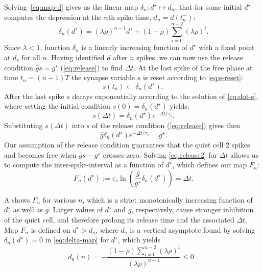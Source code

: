 \documentclass[utf8,draft]{frontiersFPHY} %
\newcommand{\dstar}{d^\star}
\newcommand{\gbar}{\bar g}
\newcommand{\delt}{\Delta t}
\newcommand{\dn}{\delta_n}
\begin{document}
Solving~\eqref{eq:map-d} gives us the linear map $\delta_{n}:d^{\star}\mapsto d_{n}$, that for some initial $d^{\star}$ computes the depression at the $n$th spike time, $d_{n}=d(t_{n}^{-})$:
\begin{equation}
 ~\label{eq:delta-map}
  \delta_{n}(d^{\star}) = (\lambda \rho)^{n-1} d^{\star} + (1-\rho)\sum_{i=0}^{n-2}(\lambda \rho)^{i}.
\end{equation}
Since $\lambda < 1$, function $\delta_{n}$ is a linearly increasing function of $d^{\star}$ with a fixed point at $d_{s}$ for all $n$.
Having identified $d$ after $n$ spikes, we can now use the release condition $\gbar s = g^{\star}$ (\cref{eq:release}) to find $\delt$.
At the last spike of the free phase at time $t_{n}=(n-1)T$ the synapse variable $s$ is reset according to \cref{eq:s-reset}:
\begin{equation}
  s(t_{n})\leftarrow \dn(\dstar).
\end{equation}
After the last spike $s$ decays exponentially according to the solution of \cref{eq:dot-s}, where setting the initial condition $s(0)=\dn(\dstar)$ yields:
\begin{equation}
~\label{eq:s-sol}
  s(\delt)=\dn(\dstar)e^{-\Delta t/\tau_{s}}.
\end{equation}
Substituting $s(\delt)$ into $s$ of the release condition (\cref{eq:release}) gives then
\begin{equation}
 ~\label{eq:release2}
  \gbar \dn(\dstar) e^{-\delt/\tau_{s}}=g^{\star}.
\end{equation}
Our assumption of the release condition guarantees that the quiet cell 2 spikes and becomes free when $\gbar s - g^{\star}$ crosses zero.
Solving \cref{eq:release2} for $\delt$ allows us to compute the inter-spike-interval as a function of $\dstar$, which defines our map $F_n$:
\begin{equation}
 ~\label{eq:Fn-map}
  F_{n}(d^{\star}):=\tau_{s}\ln{\left(\frac{\gbar }{g^{\star}} \delta_{n}(d^{\star})\right)}= \delt.
\end{equation}

A shows $F_n$ for various $n$, which is a strict monotonically increasing function of $d^{\star}$ as well as $\gbar$.
Larger values of $d^{\star}$ and $\gbar$, respectively, cause stronger inhibition of the quiet cell, and therefore prolong its release time and the associated $\delt$.
Map $F_{n}$ is defined on $d^{\star}>d_{a}$, where $d_{a}$ is a vertical asymptote found by solving $\delta_{n}(\dstar)=0$ in \cref{eq:delta-map} for $\dstar$, which yields
\begin{equation}
  d_{a}(n)=-\frac{(1-\rho)\sum_{i=0}^{n-2}(\lambda \rho)^{i}}{ (\lambda \rho)^{n-1} }\leq 0~\label{eq:da}.
\end{equation}
\end{document}
